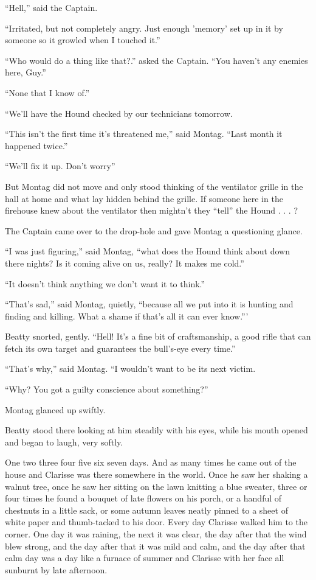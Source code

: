 \documentclass[11pt,openany]{book}
\begin{document}
``Hell,'' said the Captain.

``Irritated, but not completely angry. Just enough 'memory' set up in it by someone so it growled when I touched it.''

``Who would do a thing like that?.'' asked the Captain. ``You haven't any enemies here, Guy.''

``None that I know of.''

``We'll have the Hound checked by our technicians tomorrow.

``This isn't the first time it's threatened me,'' said Montag. ``Last month it happened twice.''

``We'll fix it up. Don't worry''

But Montag did not move and only stood thinking of the ventilator grille in the hall at home and what lay hidden behind the grille. If someone here in the firehouse knew about the ventilator then mightn't they ``tell'' the Hound . . . ?

The Captain came over to the drop-hole and gave Montag a questioning glance.

``I was just figuring,'' said Montag, ``what does the Hound think about down there nights? Is it coming alive on us, really? It makes me cold.''

``It doesn't think anything we don't want it to think.''

``That's sad,'' said Montag, quietly, ``because all we put into it is hunting and finding and killing. What a shame if that's all it can ever know.'''

Beatty snorted, gently. ``Hell! It's a fine bit of craftsmanship, a good rifle that can fetch its own target and guarantees the bull's-eye every time.''

``That's why,'' said Montag. ``I wouldn't want to be its next victim.

``Why? You got a guilty conscience about something?''

Montag glanced up swiftly.

Beatty stood there looking at him steadily with his eyes, while his mouth opened and began to laugh, very softly.

One two three four five six seven days. And as many times he came out of the house and Clarisse was there somewhere in the world. Once he saw her shaking a walnut tree, once he saw her sitting on the lawn knitting a blue sweater, three or four times he found a bouquet of late flowers on his porch, or a handful of chestnuts in a little sack, or some autumn leaves neatly pinned to a sheet of white paper and thumb-tacked to his door. Every day Clarisse walked him to the corner. One day it was raining, the next it was clear, the day after that the wind blew strong, and the day after that it was mild and calm, and the day after that calm day was a day like a furnace of summer and Clarisse with her face all sunburnt by late afternoon.
\end{document}
